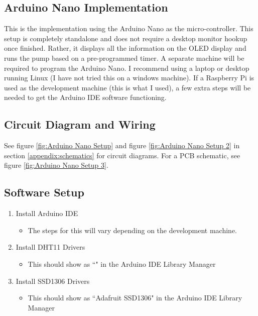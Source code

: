 \documentclass{article}
\begin{document}
\begin{multicols}{2}
		\section{Arduino Nano Implementation}
		This is the implementation using the Arduino Nano as the micro-controller. This setup is completely standalone and does not require a desktop monitor hookup once finished. Rather, it displays all the information on the OLED display and runs the pump based on a pre-programmed timer. A separate machine will be required to program the Arduino Nano. I recommend using a laptop or desktop running Linux (I have not tried this on a windows machine). If a Raspberry Pi is used as the development machine (this is what I used), a few extra steps will be needed to get the Arduino IDE software functioning. 
		
		\subsection{Circuit Diagram and Wiring}
		See figure \ref{fig:Arduino Nano Setup} and figure \ref{fig:Arduino Nano Setup 2} in section \ref{appendix:schematics} for circuit diagrams. For a PCB schematic, see figure \ref{fig:Arduino Nano Setup 3}.
		
		
		
		\subsection{Software Setup}
		\begin{enumerate}
			\item Install Arduino IDE
			\begin{itemize}
				\item The steps for this will vary depending on the development machine.
			\end{itemize}
			\item Install DHT11 Drivers
			\begin{itemize}
				\item This should show as ``" in the Arduino IDE Library Manager
			\end{itemize}
			\item Install SSD1306 Drivers
			\begin{itemize}
				\item This should show as ``Adafruit SSD1306" in the Arduino IDE Library Manager
			\end{itemize}
		\end{enumerate}
		

\end{multicols}
\end{document}
